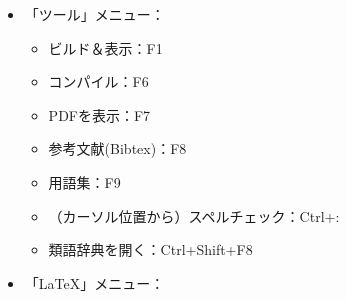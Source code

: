 \begin{itemize}
  \begin{itemize}
    \item
      単語／コマンド／環境の削除：Alt+Del
    \item
      LaTeXとして貼り付け：Ctrl+Shift+V
    \item
      プレビューの表示：Alt+P
    \item
      コメントアウト：Ctrl+T
    \item
      コメントアウトの解除：Ctrl+U
    \item
      次のLaTeXエラーへ移動：Ctrl+Shift+Down
    \item
      前のLaTeXエラーへ移動：Ctrl+Shift+Up
    \item
      次のLaTeXの良くないボックスへ移動：Shift+Alt+Down
    \item
      前のLaTeXの良くないボックスへ移動：Shift+Alt+Up
    \item
      定義へ移動：Ctrl+Alt+F
    \item
      標準的な補完：Ctrl+Space
    \item
      \verb+\begin{+の補完：Ctrl+Alt+Space
    \item
      通常のテキストの補完：Alt+Shift+Space
    \item
      最後に開いていた環境を閉じる：Alt+Return
    \item
      プレースホルダーを削除：Ctrl+Shift+K
  \end{itemize}
\item
  「ツール」メニュー：

  \begin{itemize}
  \item
    ビルド＆表示：F1
  \item
    コンパイル：F6
  \item
    PDFを表示：F7
  \item
    参考文献(Bibtex)：F8
  \item
    用語集：F9
  \item
    （カーソル位置から）スペルチェック：Ctrl+:
  \item
    類語辞典を開く：Ctrl+Shift+F8
  \end{itemize}
\item
  「LaTeX」メニュー：


\end{itemize}
